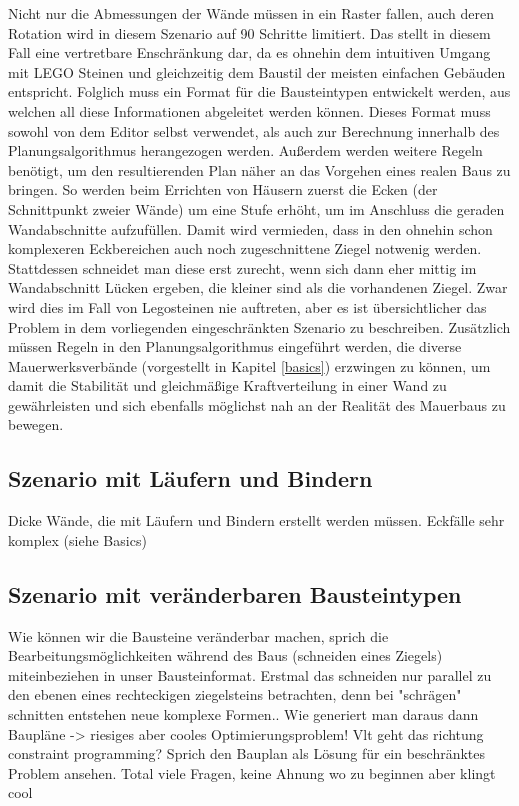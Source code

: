 Nicht nur die Abmessungen der Wände müssen in ein Raster fallen, auch deren Rotation wird in diesem Szenario auf 90\textdegree{} Schritte limitiert. 
Das stellt in diesem Fall eine vertretbare Enschränkung dar, da es ohnehin dem intuitiven Umgang mit LEGO Steinen und gleichzeitig dem Baustil der meisten einfachen Gebäuden entspricht.
Folglich muss ein Format für die Bausteintypen entwickelt werden, aus welchen all diese Informationen abgeleitet werden können.
Dieses Format muss sowohl von dem Editor selbst verwendet, als auch zur Berechnung innerhalb des Planungsalgorithmus herangezogen werden.
Außerdem werden weitere Regeln benötigt, um den resultierenden Plan näher an das Vorgehen eines realen Baus zu bringen.
So werden beim Errichten von Häusern zuerst die Ecken (der Schnittpunkt zweier Wände) um eine Stufe erhöht, um im Anschluss die geraden Wandabschnitte aufzufüllen.
Damit wird vermieden, dass in den ohnehin schon komplexeren Eckbereichen auch noch zugeschnittene Ziegel notwenig werden.
Stattdessen schneidet man diese erst zurecht, wenn sich dann eher mittig im Wandabschnitt Lücken ergeben, die kleiner sind als die vorhandenen Ziegel.
Zwar wird dies im Fall von Legosteinen nie auftreten, aber es ist übersichtlicher das Problem in dem vorliegenden eingeschränkten Szenario zu beschreiben.
Zusätzlich müssen Regeln in den Planungsalgorithmus eingeführt werden, die diverse Mauerwerksverbände (vorgestellt in Kapitel \ref{basics}) erzwingen zu können, um damit die Stabilität und gleichmäßige Kraftverteilung in einer Wand zu gewährleisten und sich ebenfalls möglichst nah an der Realität des Mauerbaus zu bewegen.

\subsection{Szenario mit Läufern und Bindern}
Dicke Wände, die mit Läufern und Bindern erstellt werden müssen.
Eckfälle sehr komplex (siehe Basics)

\subsection{Szenario mit veränderbaren Bausteintypen}
Wie können wir die Bausteine veränderbar machen, sprich die Bearbeitungsmöglichkeiten während des Baus (schneiden eines Ziegels) miteinbeziehen in unser Bausteinformat.
Erstmal das schneiden nur parallel zu den ebenen eines rechteckigen ziegelsteins betrachten, denn bei "schrägen" schnitten entstehen neue komplexe Formen..
Wie generiert man daraus dann Baupläne -> riesiges aber cooles Optimierungsproblem!
Vlt geht das richtung constraint programming? Sprich den Bauplan als Lösung für ein beschränktes Problem ansehen.
Total viele Fragen, keine Ahnung wo zu beginnen aber klingt cool

